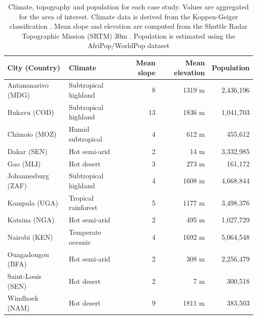 \documentclass[remotesensing,article,submit,moreauthors,pdftex,10pt,a4paper]{Definitions/mdpi}
\begin{document}
\begin{table}[H]
	\caption{%
		Climate, topography and population for each case study. Values are
		aggregated for the area of interest. Climate data is derived from the
		Koppen-Geiger classification \cite{Kottek2006, Rubel2017}. Mean slope and
		elevation are computed from the Shuttle Radar Topographic Mission (SRTM) 30m
		\cite{NASAJPL2013}. Population is estimated using the AfriPop/WorldPop
		dataset \cite{Linard2012b, Worldpop2016}}
	\centering
	\begin{tabular}{llrrr}
		\toprule
		\textbf{City (Country)} & \textbf{Climate}     & \textbf{Mean slope} & \textbf{Mean elevation} & \textbf{Population} \\
		\midrule
		Antananarivo (MDG)      & Subtropical highland & 8\degree            & 1319 m                  & 2,436,196           \\
		Bukavu (COD)            & Subtropical highland & 13\degree           & 1836 m                  & 1,041,703           \\
		Chimoio (MOZ)           & Humid subtropical    & 4\degree            & 612 m                   & 455,612             \\
		Dakar (SEN)             & Hot semi-arid        & 2\degree            & 14 m                    & 3,332,985           \\
		Gao (MLI)               & Hot desert           & 3\degree            & 273 m                   & 161,172             \\
		Johannesburg (ZAF)      & Subtropical highland & 4\degree            & 1608 m                  & 4,668,844           \\
		Kampala (UGA)           & Tropical rainforest  & 5\degree            & 1177 m                  & 3,498,376           \\
		Katsina (NGA)           & Hot semi-arid        & 2\degree            & 495 m                   & 1,027,729           \\
		Nairobi (KEN)           & Temperate oceanic    & 4\degree            & 1692 m                  & 5,064,548           \\
		Ouagadougou (BFA)       & Hot semi-arid        & 2\degree            & 308 m                   & 2,256,479           \\
		Saint-Louis (SEN)       & Hot desert           & 2\degree            & 7 m                     & 300,518             \\
		Windhoek (NAM)          & Hot desert           & 9\degree            & 1811 m                  & 383,503             \\
		\bottomrule
	\end{tabular}
	\label{tbl:case-studies}
\end{table}
\end{document}
